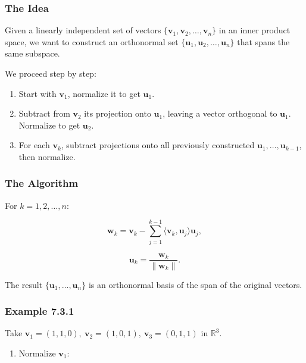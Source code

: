 \documentclass[
  12pt,
  a4paper,
]{article}
\begin{document}
\subsubsection{The Idea}\label{the-idea}

Given a linearly independent set of vectors
\(\{\mathbf{v}_1, \mathbf{v}_2, \dots, \mathbf{v}_n\}\) in an inner
product space, we want to construct an orthonormal set
\(\{\mathbf{u}_1, \mathbf{u}_2, \dots, \mathbf{u}_n\}\) that spans the
same subspace.

We proceed step by step:

\begin{enumerate}
\def\labelenumi{\arabic{enumi}.}
\item
  Start with \(\mathbf{v}_1\), normalize it to get \(\mathbf{u}_1\).
\item
  Subtract from \(\mathbf{v}_2\) its projection onto \(\mathbf{u}_1\),
  leaving a vector orthogonal to \(\mathbf{u}_1\). Normalize to get
  \(\mathbf{u}_2\).
\item
  For each \(\mathbf{v}_k\), subtract projections onto all previously
  constructed \(\mathbf{u}_1, \dots, \mathbf{u}_{k-1}\), then normalize.
\end{enumerate}

\subsubsection{The Algorithm}\label{the-algorithm}

For \(k = 1, 2, \dots, n\):

\[\mathbf{w}_k = \mathbf{v}_k - \sum_{j=1}^{k-1} \langle \mathbf{v}_k, \mathbf{u}_j \rangle \mathbf{u}_j,\]

\[\mathbf{u}_k = \frac{\mathbf{w}_k}{\|\mathbf{w}_k\|}.\]

The result \(\{\mathbf{u}_1, \dots, \mathbf{u}_n\}\) is an orthonormal
basis of the span of the original vectors.

\subsubsection{Example 7.3.1}\label{example-731}

Take
\(\mathbf{v}_1 = (1,1,0), \ \mathbf{v}_2 = (1,0,1), \ \mathbf{v}_3 = (0,1,1)\)
in \(\mathbb{R}^3\).

\begin{enumerate}
\def\labelenumi{\arabic{enumi}.}
\item
  Normalize \(\mathbf{v}_1\):
\end{enumerate}
\end{document}

